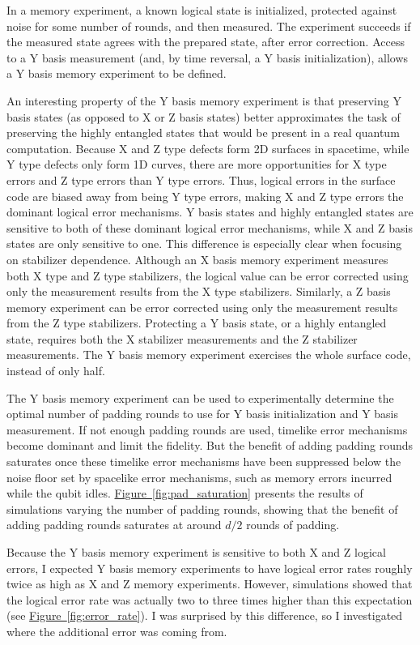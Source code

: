 \documentclass[onecolumn,unpublished,a4paper]{quantumarticle}
\theoremstyle{definition}
\theoremstyle{definition}
\theoremstyle{definition}
\newcommand{\fig}[1]{\hyperref[fig:#1]{Figure~\ref*{fig:#1}}}
\begin{document}
In a memory experiment, a known logical state is initialized, protected against noise for some number of rounds, and then measured.
The experiment succeeds if the measured state agrees with the prepared state, after error correction.
Access to a Y basis measurement (and, by time reversal, a Y basis initialization), allows a Y basis memory experiment to be defined.

An interesting property of the Y basis memory experiment is that preserving Y basis states (as opposed to X or Z basis states) better approximates the task of preserving the highly entangled states that would be present in a real quantum computation.
Because X and Z type defects form 2D surfaces in spacetime, while Y type defects only form 1D curves, there are more opportunities for X type errors and Z type errors than Y type errors.
Thus, logical errors in the surface code are biased away from being Y type errors, making X and Z type errors the dominant logical error mechanisms.
Y basis states and highly entangled states are sensitive to both of these dominant logical error mechanisms, while X and Z basis states are only sensitive to one.
This difference is especially clear when focusing on stabilizer dependence.
Although an X basis memory experiment measures both X type and Z type stabilizers, the logical value can be error corrected using only the measurement results from the X type stabilizers.
Similarly, a Z basis memory experiment can be error corrected using only the measurement results from the Z type stabilizers.
Protecting a Y basis state, or a highly entangled state, requires both the X stabilizer measurements and the Z stabilizer measurements.
The Y basis memory experiment exercises the whole surface code, instead of only half.

The Y basis memory experiment can be used to experimentally determine the optimal number of padding rounds to use for Y basis initialization and Y basis measurement.
If not enough padding rounds are used, timelike error mechanisms become dominant and limit the fidelity.
But the benefit of adding padding rounds saturates once these timelike error mechanisms have been suppressed below the noise floor set by spacelike error mechanisms, such as memory errors incurred while the qubit idles.
\fig{pad_saturation} presents the results of simulations varying the number of padding rounds, showing that the benefit of adding padding rounds saturates at around $d/2$ rounds of padding.

Because the Y basis memory experiment is sensitive to both X and Z logical errors, I expected Y basis memory experiments to have logical error rates roughly twice as high as X and Z memory experiments.
However, simulations showed that the logical error rate was actually two to three times higher than this expectation (see \fig{error_rate}).
I was surprised by this difference, so I investigated where the additional error was coming from.
\end{document}
